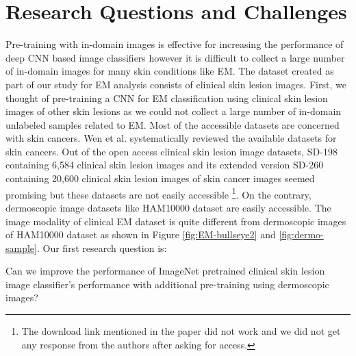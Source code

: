 \section{Research Questions and Challenges}\label{sec:research-questions}
Pre-training with in-domain images is effective for increasing the performance of deep CNN based image classifiers however it is difficult to collect a large number of in-domain images for many skin conditions like EM. The dataset created as part of our study for EM analysis consists of clinical skin lesion images. First, we thought of pre-training a CNN for EM classification using clinical skin lesion images of other skin lesions as we could not collect a large number of in-domain unlabeled samples related to EM. Most of the accessible datasets are concerned with skin cancers. Wen et al. \cite{WEN2022e64} systematically reviewed the available datasets for skin cancers. Out of the open access clinical skin lesion image datasets, SD-198 \cite{sun2016benchmark} containing 6,584 clinical skin lesion images and its extended version SD-260 \cite{8736039} containing 20,600 clinical skin lesion images of skin cancer images seemed promising but these datasets are not easily accessible \footnote{ The download link mentioned in the paper did not work and we did not get any response from the authors after asking for access.}. On the contrary, dermoscopic image datasets like HAM10000 dataset \cite{Tschandl2018} are easily accessible. The image modality of clinical EM dataset is quite different from dermoscopic images of HAM10000 dataset as shown in Figure \ref{fig:EM-bullseye2} and \ref{fig:dermo-sample}. Our first research question is:
\begin{researchquestion}\label{question1}
	Can we improve the performance of ImageNet pretrained clinical skin lesion image classifier's performance with additional pre-training using dermoscopic images?
\end{researchquestion}

